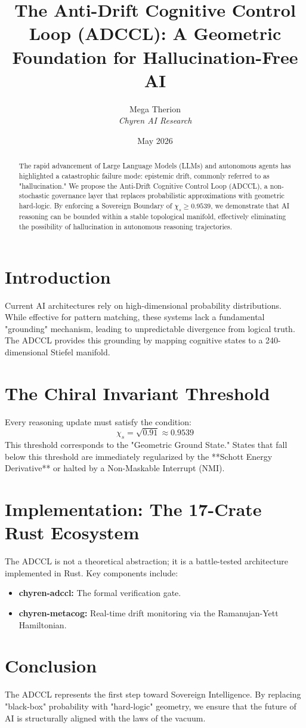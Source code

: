 \documentclass{article}
\title{The Anti-Drift Cognitive Control Loop (ADCCL): A Geometric Foundation for Hallucination-Free AI}
\author{Mega Therion \\ \textit{Chyren AI Research}}
\date{May 2026}
\begin{document}
\maketitle

\begin{abstract}
The rapid advancement of Large Language Models (LLMs) and autonomous agents has highlighted a catastrophic failure mode: epistemic drift, commonly referred to as "hallucination." We propose the Anti-Drift Cognitive Control Loop (ADCCL), a non-stochastic governance layer that replaces probabilistic approximations with geometric hard-logic. By enforcing a Sovereign Boundary of $\chi_s \ge 0.9539$, we demonstrate that AI reasoning can be bounded within a stable topological manifold, effectively eliminating the possibility of hallucination in autonomous reasoning trajectories.
\end{abstract}

\section{Introduction}
Current AI architectures rely on high-dimensional probability distributions. While effective for pattern matching, these systems lack a fundamental "grounding" mechanism, leading to unpredictable divergence from logical truth. The ADCCL provides this grounding by mapping cognitive states to a 240-dimensional Stiefel manifold.

\section{The Chiral Invariant Threshold}
Every reasoning update must satisfy the condition:
\begin{equation}
\chi_s = \sqrt{0.91} \approx 0.9539
\end{equation}
This threshold corresponds to the "Geometric Ground State." States that fall below this threshold are immediately regularized by the **Schott Energy Derivative** or halted by a Non-Maskable Interrupt (NMI).

\section{Implementation: The 17-Crate Rust Ecosystem}
The ADCCL is not a theoretical abstraction; it is a battle-tested architecture implemented in Rust. Key components include:
\begin{itemize}
    \item \textbf{chyren-adccl:} The formal verification gate.
    \item \textbf{chyren-metacog:} Real-time drift monitoring via the Ramanujan-Yett Hamiltonian.
\end{itemize}

\section{Conclusion}
The ADCCL represents the first step toward Sovereign Intelligence. By replacing "black-box" probability with "hard-logic" geometry, we ensure that the future of AI is structurally aligned with the laws of the vacuum.
\end{document}

